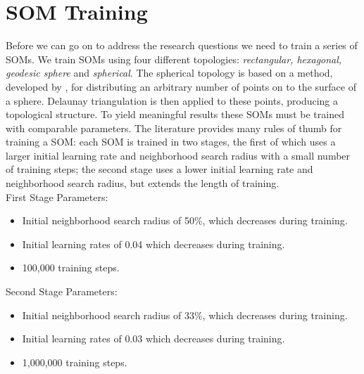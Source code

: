 


\section{SOM Training}
\label{meth:train}
Before we can go on to address the research questions we need to train a
series of SOMs.  We train SOMs using four different topologies:
\emph{rectangular, hexagonal, geodesic sphere} and \emph{spherical}.  The spherical
topology is based on a method, developed by \cite{Rakhmanov94}, for
distributing an arbitrary number of points on to the surface of a sphere.
Delaunay triangulation is then applied to these points, producing a
topological structure.  To yield meaningful results these SOMs must be trained
with comparable parameters.  The literature provides many rules of thumb for
training a SOM: each SOM is trained in two stages, the first of which uses a larger
initial learning rate and neighborhood search radius with a small number of
training steps; the second stage uses a lower initial learning rate and
neighborhood search radius, but extends the length of training.
\\
First Stage Parameters:
\begin{itemize}
  \item Initial neighborhood search radius of 50\%, which decreases during training. 
  \item Initial learning rates of 0.04 which decreases during training.
  \item 100,000 training steps.
\end{itemize}
Second Stage Parameters:
\begin{itemize}
  \item Initial neighborhood search radius of 33\%, which decreases during training. 
  \item Initial learning rates of 0.03 which decreases during training.
  \item 1,000,000 training steps.
\end{itemize}

